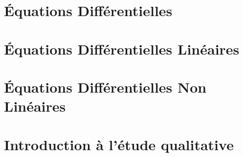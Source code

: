 



\chapter{Équations Différentielles}


\chapter{Équations Différentielles Linéaires}


\chapter{Équations Différentielles Non Linéaires}


\chapter{Introduction à l'étude qualitative}

